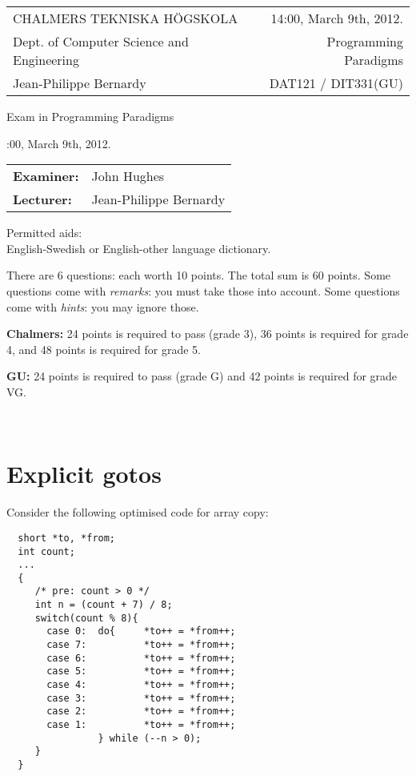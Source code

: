 \documentclass{article}
\begin{document}
\newcommand{\examtime}{14:00, March 9th, 2012}
\newcommand{\points}[1]{\marginpar{\bf #1 points}}
\noindent
\begin{tabular}{lr}
CHALMERS TEKNISKA H\"OGSKOLA &\examtime{}.\\
Dept. of Computer Science and Engineering & Programming Paradigms\\
Jean-Philippe Bernardy                 & DAT121 / DIT331(GU) \\
\end{tabular}

\vspace{2.5cm} \noindent
\begin{center} {\LARGE
Exam in Programming Paradigms}
\end{center}

\vspace{1.5cm}

\noindent
\examtime{}.\\
\begin{tabular}{ll}
\textbf{Examiner:} &  John Hughes  \\
\textbf{Lecturer:} & Jean-Philippe Bernardy
\end{tabular}
\vspace{1cm}

\noindent
Permitted aids:\\
English-Swedish or English-other language dictionary.

There are 6 questions: each worth 10 points. The total sum is 60
points.  Some questions come with \emph{remarks}: you must take those
into account.  Some questions come with \emph{hints}: you may ignore
those.


\textbf{Chalmers:}
24 points is required to pass (grade 3), 36 points is required for
grade 4, and 48 points is required for grade 5. 

\textbf{GU:} 
24 points is required to pass (grade G) and 42 points is
required for grade VG.


\newpage
\hfill\\
\newpage


\section{Explicit gotos}

Consider the following optimised code for array copy:
\begin{verbatim}
  short *to, *from;
  int count;
  ...
  {
     /* pre: count > 0 */
     int n = (count + 7) / 8;
     switch(count % 8){
       case 0:	do{     *to++ = *from++;
       case 7:	        *to++ = *from++;
       case 6:	        *to++ = *from++;
       case 5:	        *to++ = *from++;
       case 4:	        *to++ = *from++;
       case 3:	        *to++ = *from++;
       case 2:	        *to++ = *from++;
       case 1:	        *to++ = *from++;
                } while (--n > 0);
     }
  }
\end{verbatim}
\end{document}
